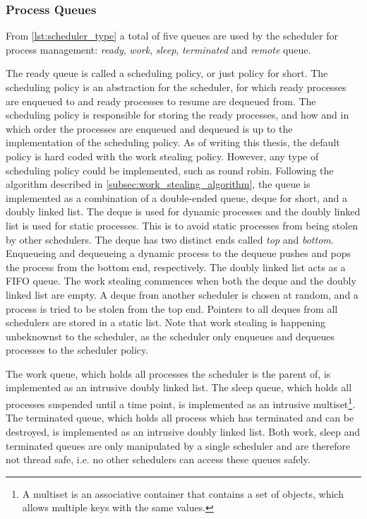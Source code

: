 \subsubsection{Process Queues}


From \cref{lst:scheduler_type} a total of five queues are used by the scheduler for process management: \textit{ready}, \textit{work}, \textit{sleep}, \textit{terminated} and \textit{remote} queue. 

The ready queue is called a scheduling policy, or just policy for short. The scheduling policy is an abstraction for the scheduler, for which ready processes are enqueued to and ready processes to resume are dequeued from. The scheduling policy is responsible for storing the ready processes, and how and in which order the processes are enqueued and dequeued is up to the implementation of the scheduling policy. As of writing this thesis, the default policy is hard coded with the work stealing policy. However, any type of scheduling policy could be implemented, such as round robin. Following the algorithm described in \cref{subsec:work_stealing_algorithm}, the queue is implemented as a combination of a double\hyp{}ended queue, deque for short, and a doubly linked list. The deque is used for dynamic processes and the doubly linked list is used for static processes. This is to avoid static processes from being stolen by other schedulers. The deque has two distinct ends called \textit{top} and \textit{bottom}. Enqueueing and dequeueing a dynamic process to the dequeue pushes and pops the process from the bottom end, respectively. The doubly linked list acts as a FIFO queue. The work stealing commences when both the deque and the doubly linked list are empty. A deque from another scheduler is chosen at random, and a process is tried to be stolen from the top end. Pointers to all deques from all schedulers are stored in a static list. Note that work stealing is happening unbeknownst to the scheduler, as the scheduler only enqueues and dequeues processes to the scheduler policy. 

The work queue, which holds all processes the scheduler is the parent of, is implemented as an intrusive doubly linked list. The sleep queue, which holds all processes suspended until a time point, is implemented as an intrusive multiset\footnote{A multiset is an associative container that contains a set of objects, which allows multiple keys with the same values.}. The terminated queue, which holds all process which has terminated and can be destroyed, is implemented as an intrusive doubly linked list. Both work, sleep and terminated queues are only manipulated by a single scheduler and are therefore not thread safe, i.e. no other schedulers can access these queues safely.

